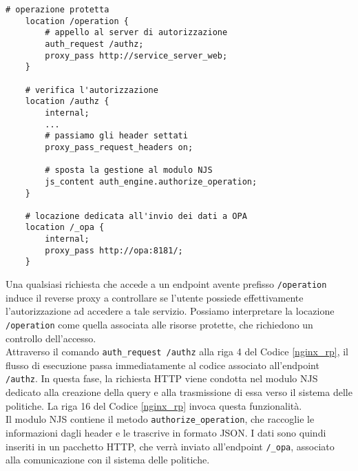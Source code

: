\lstset{language=nginx}
\begin{lstlisting}[caption={[Frammento di codice del reverse proxy]Frammento di codice del reverse proxy. La locazione \texttt{/authz} gestisce e invia la richiesta a 
    OPA, e in base alla sua risposta inoltra la richiesta o meno attraverso la keyword \texttt{proxy\_pass}.},captionpos=b,label=nginx_rp]
    # operazione protetta
    location /operation {
        # appello al server di autorizzazione
        auth_request /authz; 
        proxy_pass http://service_server_web;
    }

    # verifica l'autorizzazione
    location /authz {
        internal;
        ...
        # passiamo gli header settati
        proxy_pass_request_headers on; 

        # sposta la gestione al modulo NJS  
        js_content auth_engine.authorize_operation;
    }

    # locazione dedicata all'invio dei dati a OPA
    location /_opa {
        internal; 
        proxy_pass http://opa:8181/;
    }
\end{lstlisting}
Una qualsiasi richiesta che accede a un endpoint avente prefisso \texttt{/operation} induce il reverse proxy a controllare 
se l'utente possiede effettivamente l'autorizzazione ad accedere a tale servizio. Possiamo interpretare la locazione \texttt{/operation}
come quella associata alle risorse protette, che richiedono un controllo dell'accesso. 
\\ Attraverso il comando \texttt{auth\_request /authz} alla riga 4 del Codice \ref*{nginx_rp},
il flusso di esecuzione passa immediatamente al codice associato all'endpoint \texttt{/authz}. 
In questa fase, la richiesta HTTP viene condotta nel modulo NJS dedicato alla creazione della query e alla trasmissione di essa verso il sistema delle politiche.
La riga 16 del Codice \ref*{nginx_rp} invoca questa funzionalità. \\
Il modulo NJS contiene il metodo \texttt{authorize\_operation}, che raccoglie le informazioni dagli header 
e le trascrive in formato JSON.
I dati sono quindi inseriti in un pacchetto HTTP, che verrà inviato all'endpoint \texttt{/\_opa}, 
 associato alla comunicazione con il sistema delle politiche.
\lstset{language=nginx}
